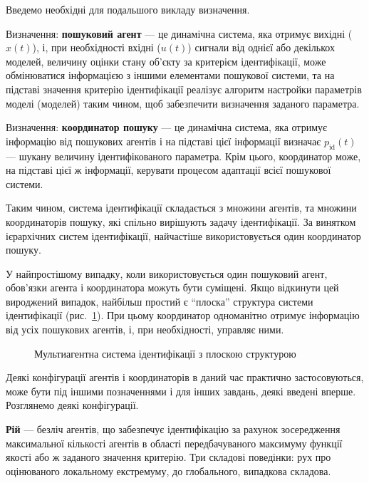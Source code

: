 \documentclass[a4paper,13pt]{atuaref}
\begin{document}
Введемо необхідні для подальшого викладу визначення.

Визначення:
\textbf{пошуковий агент} --- це динамічна система, яка отримує вихідні ($x(t)$),
і, при необхідності вхідні ($u(t)$) сигнали від однієї або декількох моделей,
величину оцінки стану об'єкту за критерієм ідентифікації,
може обмінюватися інформацією з іншими елементами пошукової системи,
та на підставі значення критерію
ідентифікації реалізує алгоритм настройки параметрів моделі (моделей) таким
чином, щоб забезпечити визначення заданого параметра.

Визначення:
\textbf{координатор пошуку} --- це динамічна система, яка отримує інформацію
від пошукових агентів і на підставі цієї інформації визначає
$p_{\mathrm{id}}(t)$ --- шукану величину ідентифікованого параметра.
Крім цього, координатор може, на підставі цієї ж інформації,
керувати процесом адаптації всієї пошукової системи.

Таким чином, система ідентифікації складається з множини агентів, та
множини координаторів пошуку, які спільно вирішують задачу ідентифікації.
За винятком ієрархічних систем ідентифікації, найчастіше використовується один координатор пошуку.

У найпростішому випадку, коли використовується один пошуковий агент, обов'язки
агента і координатора можуть бути суміщені. Якщо відкинути цей вироджений
випадок, найбільш простий є ``плоска'' структура системи ідентифікації (рис.~\ref{atu:f:agents_flat}).
При цьому координатор одноманітно отримує
інформацію від усіх пошукових агентів, і, при необхідності, управляє ними.

\begin{figure}[htb!]
\begin{center}

\end{center}
\caption{Мультиагентна система ідентифікації з плоскою структурою}
\label{atu:f:agents_flat}
\end{figure}

Деякі конфігурації агентів і координаторів в даний час практично
застосовуються, може бути під іншими позначеннями і для інших завдань, деякі
введені вперше. Розглянемо деякі конфігурації.

\textbf{Рій} --- безліч агентів, що забезпечує ідентифікацію за рахунок
зосередження максимальної кількості агентів в області передбачуваного максимуму
функції якості або ж заданого значення критерію. Три складові поведінки: рух
про оцінюваного локальному екстремуму, до глобального, випадкова складова.
\end{document}
